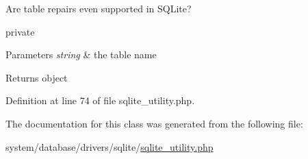 Are table repairs even supported in S\-Q\-Lite?

private 
\begin{DoxyParams}{Parameters}
{\em string} & the table name \\
\hline
\end{DoxyParams}
\begin{DoxyReturn}{Returns}
object 
\end{DoxyReturn}


Definition at line 74 of file sqlite\-\_\-utility.\-php.



The documentation for this class was generated from the following file\-:\begin{DoxyCompactItemize}
\item 
system/database/drivers/sqlite/\hyperlink{sqlite__utility_8php}{sqlite\-\_\-utility.\-php}\end{DoxyCompactItemize}
